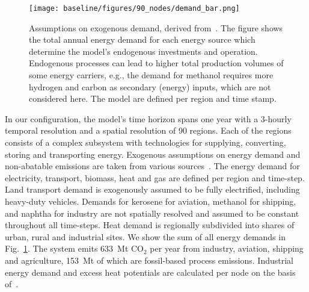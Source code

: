 \documentclass[twocolumn]{article}
\newcommand{\COtwo}{CO$_2$}
\begin{document}
\begin{figure}
    \texttt{[image: baseline/figures/90\_nodes/demand\_bar.png]}
    \caption{Assumptions on exogenous demand, derived from~\cite{piamanzGeoreferencedIndustrialSites2018,muehlenpfordtTimeSeries2019,mantzosJRCIDEES20152018,NationalEmissionsReported2023,EurostatCompleteEnergyBalance,uwekrienDemandlib2023}. The figure shows the total annual energy demand for each energy source which determine the model's endogenous investments and operation. Endogenous processes can lead to higher total production volumes of some energy carriers, e.g., the demand for methanol requires more hydrogen and carbon as secondary (energy) inputs, which are not considered here. The model are defined per region and time stamp.}
    \label{fig:total-demand-bar}
\end{figure}


%
In our configuration, the model's time horizon spans one year with a 3-hourly temporal resolution and a spatial resolution of 90 regions. Each of the regions consists of a complex subsystem with technologies for supplying, converting, storing and transporting energy. Exogenous assumptions on energy demand and non-abatable emissions are taken from various sources~\cite{piamanzGeoreferencedIndustrialSites2018,muehlenpfordtTimeSeries2019,mantzosJRCIDEES20152018,NationalEmissionsReported2023,EurostatCompleteEnergyBalance,uwekrienDemandlib2023}. The energy demand for electricity, transport, biomass, heat and gas are defined per region and time-step.
Land transport demand is exogenously assumed to be fully electrified, including heavy-duty vehicles.
Demands for kerosene for aviation, methanol for shipping, and naphtha for industry are not spatially resolved and assumed to be constant throughout all time-steps.
Heat demand is regionally subdivided into shares of urban, rural and industrial sites.
We show the sum of all energy demands in Fig.~\ref{fig:total-demand-bar}.
The system emits 633~Mt \COtwo{} per year from industry, aviation, shipping and agriculture, 153~Mt of which are fossil-based process emissions.
Industrial energy demand and excess heat potentials are calculated per node on the basis of~\cite{hotmaps_industrial_db}.
\end{document}
